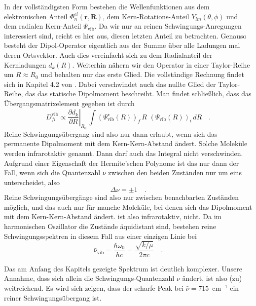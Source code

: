 In der vollständigsten Form bestehen die Wellenfunktionen aus dem elektronischen Anteil $ \Phi_n^{el}  (\mathbf{r}, \mathbf{R})  $, dem Kern-Rotations-Anteil $ Y_{l m} (\theta, \phi)$ und dem radialen Kern-Anteil  $\Psi_\text{vib}$. Da wir nur an reinen Schwingungs-Anregungen interessiert sind, reicht es hier aus, diesen letzten Anteil zu betrachten. Genauso besteht der Dipol-Operator eigentlich aus der Summe über alle Ladungen mal deren Ortsvektor. Auch dies vereinfacht sich zu dem Radialanteil der Kernladungen $d_k(R)$. Weiterhin nähern wir den Operator in einer Taylor-Reihe um $R \approx R_0$ und behalten nur das erste Glied. Die vollständige Rechnung findet sich in Kapitel 4.2 von \cite{Demtröder_molekuelphysik}. Dabei verschwindet auch das nullte Glied der Taylor-Reihe, das das statische Dipolmoment beschreibt. Man findet schließlich, dass das Übergangsmatrixelement gegeben ist durch
\begin{equation}
D_{fi}^\text{vib} \propto  \left. \frac{\partial d_k}{\partial R} \right|_{R_0} \,  \int (\Psi_\text{vib}^\star (R) )_f \, R  \, \, (\Psi_\text{vib} (R) )_i \, dR \quad .
\end{equation}
Reine Schwingungsübergang sind also nur dann erlaubt, wenn sich das permanente Dipolmoment mit dem Kern-Kern-Abstand ändert. Solche Moleküle werden infrarotaktiv genannt. Dann  darf auch das Integral nicht verschwinden. Aufgrund einer Eigenschaft der Hermite'schen Polynome ist das nur dann der Fall, wenn sich die Quantenzahl $\nu$ zwischen den beiden Zuständen nur um eins unterscheidet, also 
\begin{equation}
 \Delta \nu = \pm 1 \quad .
\end{equation}
Reine Schwingungsübergänge sind also nur zwischen benachbarten Zuständen möglich, und das auch nur für manche Moleküle, bei denen sich das Dipolmoment mit dem Kern-Kern-Abstand ändert.  ist also infrarotaktiv,  nicht. Da im harmonischen Oszillator die Zustände äquidistant sind, bestehen reine Schwingungsspektren in diesem Fall aus einer einzigen Linie bei 
\begin{equation}
 \bar{\nu}_\text{vib} = \frac{\hbar \omega_0}{h c} = \frac{\sqrt{k / \mu} }{2 \pi  c} \quad .
\end{equation}

Das am Anfang des Kapitels gezeigte Spektrum ist deutlich komplexer. Unsere Annahme, dass sich allein die Schwingungs-Quantenzahl $\nu$ ändert, ist also (zu) weitreichend. Es wird sich zeigen, dass der scharfe Peak bei $\bar{\nu} = 715$~cm$^{-1}$ ein reiner Schwingungsübergang ist.

